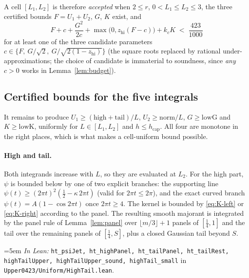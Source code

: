 \documentclass[11pt,a4paper]{article}
\theoremstyle{definition}
\newcommand{\kap}{\kappa}
\newcommand{\Lean}[1]{\texttt{#1}}
\newcommand{\file}[1]{\texttt{#1}}
\newcommand{\formal}[2]{%
  \par\smallskip
  \begingroup\small\raggedright\emergencystretch=5em
  \noindent\textit{In Lean:} \Lean{#1} in \file{#2}.\par
  \endgroup\smallskip}
\begin{document}
A cell $[L_1,L_2]$ is therefore \emph{accepted} when $2\le r$,
$0<L_1\le L_2\le3$, the three certified bounds $F=U_1+U_2$, $G$, $K$ exist, and
\[
  F+c+\frac{G^2}{2c}+\max\bigl(0,z_{\mathrm{hi}}(F-c)\bigr)+k_cK
  \;<\;\frac{423}{1000}
\]
for at least one of the three candidate parameters
$c\in\bigl\{F,\ G/\sqrt2,\ G/\sqrt{2(1-z_{\mathrm{hi}})}\bigr\}$
(the square roots replaced by rational under-approximations; the choice of
candidate is immaterial to soundness, since \emph{any} $c>0$ works in
Lemma~\ref{lem:budget}).

\subsection{Certified bounds for the five integrals}

It remains to produce $U_1\ge(\mathrm{high}+\mathrm{tail})/L$,
$U_2\ge\mathrm{norm}/L$, $G\ge\mathrm{lowG}$ and $K\ge\mathrm{lowK}$, uniformly
for $L\in[L_1,L_2]$ and $h\le h_{\mathrm{cap}}$. All four are monotone in the
right places, which is what makes a cell-uniform bound possible.

\paragraph{High and tail.} Both integrands increase with $L$, so they are
evaluated at $L_2$. For the high part, $\psi$ is bounded below by one of two
explicit branches: the supporting line
$\psi(t)\ge(2\pi t)^2(\tfrac12-\kap\,2\pi t)$ (valid for $2\pi t\le2\pi$), and
the exact curved branch $\psi(t)=A(1-\cos2\pi t)$ once $2\pi t\ge4$. The kernel is
bounded by \eqref{eq:K-left} or \eqref{eq:K-right} according to the panel. The
resulting smooth majorant is integrated by the panel rule of
Lemma~\ref{lem:panel} over $\lfloor m/3\rfloor+1$ panels of $[\tfrac14,1]$ and
the tail over the remaining panels of $[\tfrac14,S]$, plus a closed Gaussian tail
beyond $S$.
\formal{ht\_psiJet, ht\_highPanel, ht\_tailPanel, ht\_tailRest, highTailUpper, highTailUpper\_sound, highTail\_small}{Upper0423/Uniform/HighTail.lean}
\end{document}
